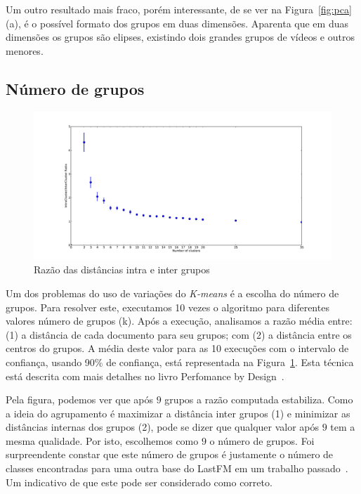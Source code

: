\documentclass[brazil,a4paper,12pt]{article}
\begin{document}
Um outro resultado mais fraco, porém interessante, de se ver na Figura~\ref{fig:pca}(a),
é o possível formato dos grupos em duas dimensões. Aparenta que em duas dimensões os
grupos são elipses, existindo dois grandes grupos de vídeos e outros menores.

\subsection{Número de grupos}

\begin{figure}
\centering
\includegraphics[scale=0.4]{betacv.pdf}
\caption{Razão das distâncias intra e inter grupos}
\label{fig:betacv}
\end{figure}

Um dos problemas do uso de variações do \emph{K-means} é a escolha do número de 
grupos. Para resolver este, executamos 10 vezes o algoritmo para diferentes valores 
número de grupos (k). Após a execução, analisamos a razão média entre: (1) a distância de cada 
documento para seu grupos; com (2) a distância entre os centros do grupos. A média deste valor
para as 10 execuções com o intervalo de confiança, usando 90\% de confiança, 
está representada na Figura~\ref{fig:betacv}. Esta técnica está descrita com mais detalhes no livro
Perfomance by Design~\cite{menasce2004performance}.

Pela figura, podemos ver que após $9$  grupos a razão computada estabiliza. Como a ideia do
agrupamento é maximizar a distância  inter grupos (1) e minimizar as distâncias internas 
dos grupos (2), pode se dizer que qualquer valor após $9$ tem a mesma qualidade. 
Por isto, escolhemos como $9$ o número de grupos. Foi surpreendente constar que este
número de grupos é justamente o número de classes encontradas para uma outra base
do LastFM em um trabalho passado~\cite{figueiredo2009evidence}. Um indicativo de que este
pode ser considerado como correto.
\end{document}
